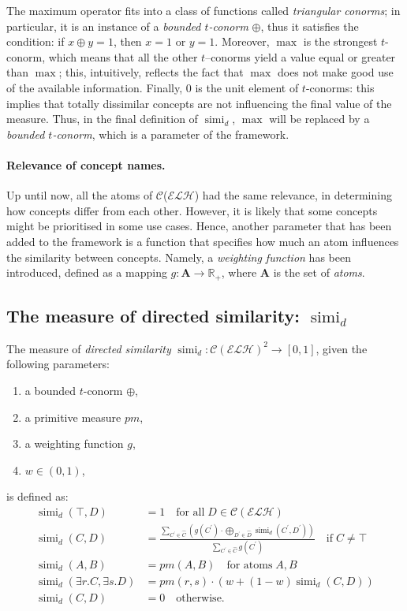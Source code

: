 \documentclass[]{llncs}
\DeclareMathOperator{\simi}{simi}
\newcommand{\elh}{\(\mathcal{ELH}{}\)}
\begin{document}
  The maximum operator fits into a class of functions called \emph{triangular conorms};%
  in particular, it is an instance of a \emph{bounded \(t\)-conorm} \(\oplus{}\), thus it satisfies the condition: if \(x \oplus y = 1\), then \(x = 1\) or \(y = 1\).
  Moreover, \(\max\) is the strongest \(t\)-conorm, which means that all the other \(t\)--conorms yield a value equal or greater than \(\max\); this, intuitively, reflects the fact that \(\max\) does not make good use of the available information.
  Finally, \(0\) is the unit element of \(t\)-conorms: this implies that totally dissimilar concepts are not influencing the final value of the measure.
  Thus, in the final definition of \(\simi_d\), \(\max\) will be replaced by a \emph{bounded \(t\)-conorm}, which is a parameter of the framework.

  \paragraph{Relevance of concept names.}
  Up until now, all the atoms of \(\mathcal{C}\)(\elh) had the same relevance, in determining how concepts differ from each other.
  However, it is likely that some concepts might be prioritised in some use cases.
  Hence, another parameter that has been added to the framework is a function that specifies how much an atom influences the similarity between concepts. Namely, a \emph{weighting function} has been introduced, defined as a mapping \(g \colon \mathbf{A} \to \mathbb{R}_+\), where \(\mathbf{A}\) is the set of \emph{atoms}.

  \subsection{The measure of directed similarity: \(\simi_d\)}

  The measure of \emph{directed similarity} \(\simi_d \colon {\mathcal{C}(\mathcal{ELH})}^2 \to [0,1]\), given the following parameters:
  \begin{enumerate}
    \item a bounded \(t\)-conorm \(\oplus\),
    \item a primitive measure \(pm\),
    \item a weighting function \(g\),
    \item \(w \in (0,1)\),
  \end{enumerate}
  is defined as:
  \begin{align*}
    \simi_d(\top,D) &= 1 \quad
    \text{for all}\; D \in \mathcal{C}(\mathcal{ELH}) \\
    \simi_d(C,D) &=
    \frac{\sum_{C^\prime \in \widehat{C}}\left(g(C^\prime) \cdot \bigoplus_{D^\prime \in \widehat{D}} \simi_d(C^\prime, D^\prime)\right)}%
    {\sum_{C^\prime \in \widehat{C}}g(C^\prime)} \quad \text{if}\; C \ne \top \\
    \simi_d(A,B) &= pm(A,B) \quad \text{for atoms}\; A,B \\
    \simi_d(\exists{}r.C,\exists{}s.D) &=
    pm(r,s) \cdot \left(w + (1-w)\simi_d(C,D)\right) \\
    \simi_d(C,D) &= 0 \quad \text{otherwise}.
  \end{align*}
\end{document}
